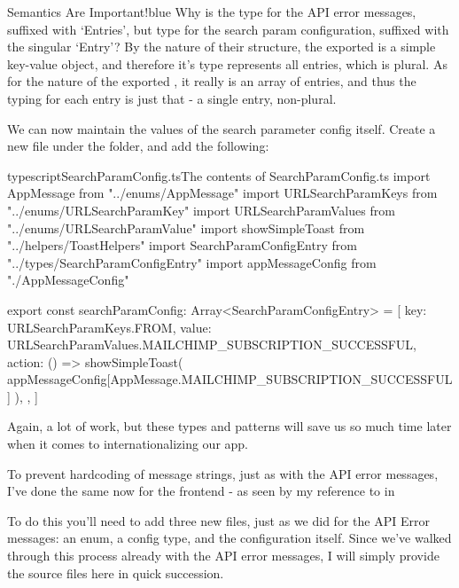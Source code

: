 \documentclass[paper=6in:9in,pagesize=pdftex,headinclude=on,footinclude=on,12pt,twoside]{scrbook}
\begin{document}
\begin{highlightBox}{Semantics Are Important!}{blue}{\information}
Why is the type for the API error messages,  suffixed with `Entries', but type for the search param configuration,  suffixed with the singular `Entry'? By the nature of their structure, the exported  is a simple key-value object, and therefore it's type represents all entries, which is plural. As for the nature of the exported , it really is an array of entries, and thus the typing for each entry is just that - a single entry, non-plural.
\end{highlightBox}

We can now maintain the values of the search parameter config itself. Create a new file  under the  folder, and add the following:

\begin{codeInput}{typescript}{SearchParamConfig.ts}{The contents of SearchParamConfig.ts}
import AppMessage from "../enums/AppMessage"
import URLSearchParamKeys from "../enums/URLSearchParamKey"
import URLSearchParamValues from "../enums/URLSearchParamValue"
import { showSimpleToast } from "../helpers/ToastHelpers"
import { SearchParamConfigEntry } from "../types/SearchParamConfigEntry"
import { appMessageConfig } from "./AppMessageConfig"

export const searchParamConfig: Array<SearchParamConfigEntry> = [
  {
    key: URLSearchParamKeys.FROM,
    value: URLSearchParamValues.MAILCHIMP_SUBSCRIPTION_SUCCESSFUL,
    action: () =>
      showSimpleToast(
        appMessageConfig[AppMessage.MAILCHIMP_SUBSCRIPTION_SUCCESSFUL]
      ),
  },
]  
\end{codeInput}

Again, a lot of work, but these types and patterns will save us so much time later when it comes to internationalizing our app.


To prevent hardcoding of message strings, just as with the API error messages, I've done the same now for the frontend - as seen by my reference to  in 

To do this you'll need to add three new files, just as we did for the API Error messages: an enum, a config type, and the configuration itself. Since we've walked through this process already with the API error messages, I will simply provide the source files here in quick succession.
\end{document}

